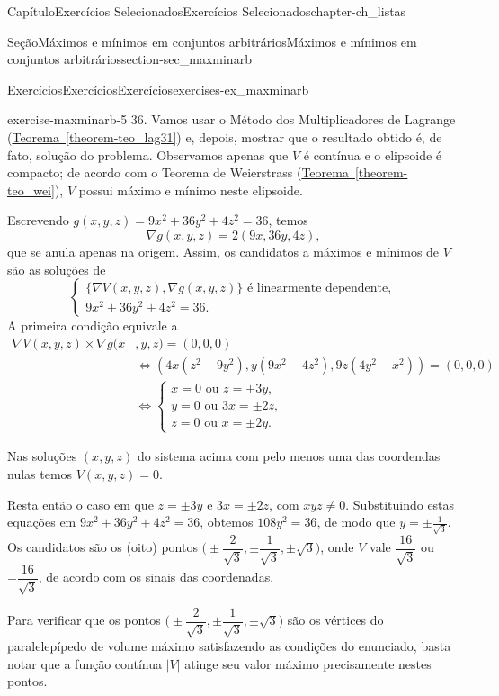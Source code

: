 \documentclass[oneside,10pt,]{book}
\newcommand{\xreffont}{\relax}
\numberwithin{equation}{section}
\begin{document}
\begin{chapterptx}{Capítulo}{Exercícios Selecionados}{}{Exercícios Selecionados}{}{}{chapter-ch_listas}
\begin{sectionptx}{Seção}{Máximos e mínimos em conjuntos arbitrários}{}{Máximos e mínimos em conjuntos arbitrários}{}{}{section-sec_maxminarb}
\begin{exercises-subsection-numberless}{Exercícios}{Exercícios}{}{Exercícios}{}{}{exercises-ex_maxminarb}
\begin{divisionexercise}{5}{}{}{exercise-maxminarb-5}
36\). Vamos usar o Método dos Multiplicadores de Lagrange (\hyperref[theorem-teo_lag31]{Teorema~{\xreffont\ref{theorem-teo_lag31}}}) e, depois, mostrar que o resultado obtido é, de fato, solução do problema. Observamos apenas que \(V\) é contínua e o elipsoide é compacto; de acordo com o Teorema de Weierstrass (\hyperref[theorem-teo_wei]{Teorema~{\xreffont\ref{theorem-teo_wei}}}), \(V\) possui máximo e mínimo neste elipsoide.%
\par
Escrevendo \(g(x,y,z) = 9x^2 + 36y^2 + 4z^2 = 36\), temos%
\begin{equation*}
\nabla g(x,y,z) = 2(9x,36y,4z),
\end{equation*}
que se anula apenas na origem. Assim, os candidatos a máximos e mínimos de \(V\) são as soluções de%
\begin{equation*}
\begin{cases}
\big\{\nabla V(x,y,z), \nabla
g(x,y,z)\big\}\text{ é linearmente dependente},\\
9x^2 + 36y^2 +4z^2 = 36.
\end{cases}
\end{equation*}
A primeira condição equivale a%
\begin{align*}
\nabla V(x,y,z) \times \nabla g(x&,y,z) = (0,0,0)\\
&\iff
(4x(z^2 - 9y^2), y(9x^2 - 4z^2), 9z(4y^2 -x^2)) =
(0,0,0)\\
&\iff \begin{cases}
x=0\text{ ou }z=\pm 3y,\\
y=0\text{ ou }3x=\pm 2z,\\
z=0\text{ ou }x=\pm2 y.
\end{cases}
\end{align*}
%
\par
Nas soluções \((x,y,z)\) do sistema acima com pelo menos uma das coordendas nulas temos \(V(x,y,z)=0\).%
\par
Resta então o caso em que \(z=\pm 3y\) e \(3x=\pm 2z\), com \(xyz\neq 0\). Substituindo estas equações em \(9x^2 +
36y^2 + 4z^2 = 36\), obtemos \(108y^2 = 36\), de modo que \(y=\pm \frac{1}{\sqrt{3}}\). Os candidatos são os (oito) pontos \(\Big(\pm \dfrac{2}{\sqrt{3}}, \pm \dfrac{1}{\sqrt{3}},
\pm\sqrt{3}\Big)\), onde \(V\) vale \(\dfrac{16}{\sqrt{3}}\) ou \(-\dfrac{16}{\sqrt{3}}\), de acordo com os sinais das coordenadas.%
\par
Para verificar que os pontos \(\Big( \pm
\dfrac{2}{\sqrt{3}}, \pm \dfrac{1}{\sqrt{3}}, \pm
\sqrt{3}\Big)\) são os vértices do paralelepípedo de volume máximo satisfazendo as condições do enunciado, basta notar que a função contínua \(|V|\) atinge seu valor máximo precisamente nestes pontos.%
\end{divisionexercise}%
\end{exercises-subsection-numberless}
\end{sectionptx}
\end{chapterptx}
\end{document}
